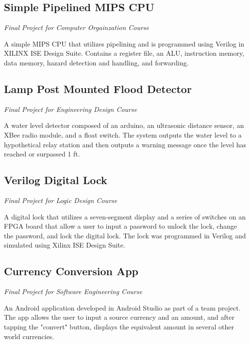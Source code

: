 \documentclass{article}
\begin{document}
\subsection{Simple Pipelined MIPS CPU} \textit{Final Project for Computer Orgainzation Course}

A simple MIPS CPU that utilizes pipelining and is programmed using Verilog in XILINX ISE Design Suite. Contains a register file, an ALU, instruction memory, data memory, hazard detection and handling, and forwarding.
\vspace{-.75em}
\subsection{Lamp Post Mounted Flood Detector} \textit{Final Project for Engineering Design Course}

A water level detector composed of an arduino, an ultrasonic distance sensor, an XBee radio module, and a float switch. The system outputs the water level to a hypothetical relay station and then outputs a warning message once the level has reached or surpassed 1 ft.
\vspace{-.75em}
\subsection{Verilog Digital Lock} \textit{Final Project for Logic Design Course}

A digital lock that utilizes a seven-segment display and a series of switches on an FPGA board that allow a user to input a password to unlock the lock, change the password, and lock the digital lock. The lock was programmed in Verilog and simulated using Xilinx ISE Design Suite.
\vspace{-.75em}
\subsection{Currency Conversion App} \textit{Final Project for Software Engineering Course}

An Android application developed in Android Studio as part of a team project. The app allows the user to input a source currency and an amount, and after tapping the "convert" button, displays the equivalent amount in several other world currencies.
\end{document}
